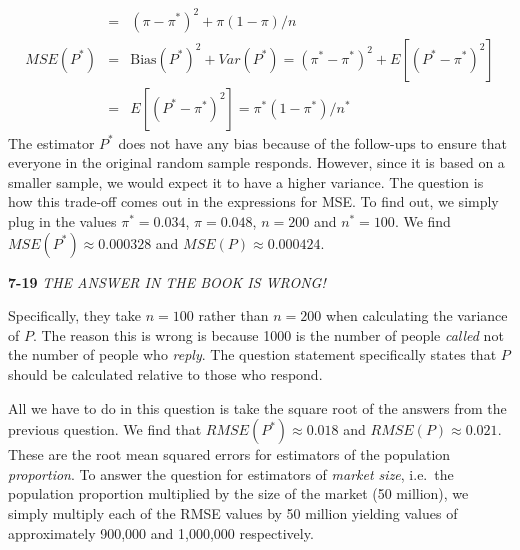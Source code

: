 \documentclass[addpoints,12pt]{exam}\usepackage[]{graphicx}\usepackage[]{color}
\begin{document}
\begin{questions}
\begin{solution}
\begin{eqnarray*}
		&=&  (\pi - \pi^*)^2 + \pi(1-\pi)/n\\
		MSE(P^*)	&=& \mbox{Bias}(P^*)^2 + Var(P^*) = (\pi^* - \pi^*)^2 + E[(P^* - \pi^*)^2]\\
			&=& E[(P^* - \pi^*)^2] = \pi^*(1-\pi^*)/n^*
	\end{eqnarray*}
The estimator $P^*$ does not have any bias because of the follow-ups to ensure that everyone in the original random sample responds. However, since it is based on a smaller sample, we would expect it to have a higher variance. The question is how this trade-off comes out in the expressions for MSE. To find out, we simply plug in the values $\pi^* = 0.034$, $\pi = 0.048$, $n =200$ and $n^* = 100$. We find $MSE(P^*) \approx 0.000328$ and $MSE(P) \approx 0.000424$.
    \end{solution}
  \item[]
    \begin{solution}
    \textbf{7-19} \emph{THE ANSWER IN THE BOOK IS WRONG!} 

\noindent Specifically, they take $n=100$ rather than $n = 200$ when calculating the variance of $P$. The reason this is wrong is because 1000 is the number of people \emph{called} not the number of people who \emph{reply}. The question statement specifically states that $P$ should be calculated relative to  those who respond.

All we have to do in this question is take the square root of the answers from the previous question. We find that $RMSE(P^*) \approx 0.018$ and $RMSE(P) \approx 0.021$. These are the root mean squared errors for estimators of the population \emph{proportion}. To answer the question for estimators of \emph{market size}, i.e.\ the population proportion multiplied by the size of the market (50 million), we simply multiply each of the RMSE values by 50 million yielding values of approximately 900,000 and 1,000,000 respectively.

    \end{solution}
\end{questions}
\end{document}
